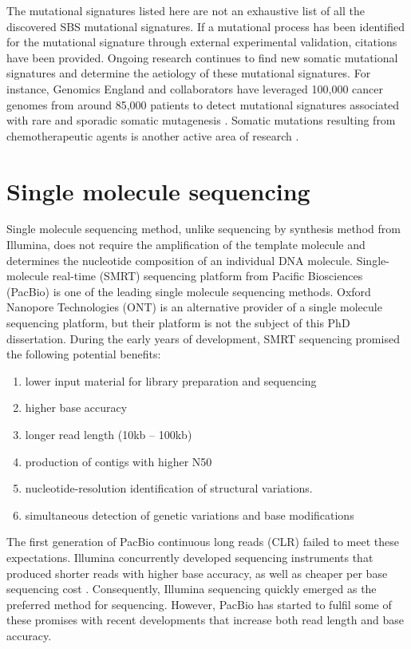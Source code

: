 \endgroup

The mutational signatures listed here are not an exhaustive list of all the discovered SBS mutational signatures. If a mutational process has been identified for the mutational signature through external experimental validation, citations have been provided. Ongoing research continues to find new somatic mutational signatures and determine the aetiology of these mutational signatures. For instance, Genomics England and collaborators have leveraged 100,000 cancer genomes from around 85,000 patients to detect mutational signatures associated with rare and sporadic somatic mutagenesis \cite{Degasperi2022-qe}. Somatic mutations resulting from chemotherapeutic agents is another active area of research \cite{Pich2019-ja, Aitken2020-sa}. 

\section{Single molecule sequencing}

Single molecule sequencing method, unlike sequencing by synthesis method from Illumina, does not require the amplification of the template molecule and determines the nucleotide composition of an individual DNA molecule. Single-molecule real-time (SMRT) sequencing platform from Pacific Biosciences (PacBio) is one of the leading single molecule sequencing methods. Oxford Nanopore Technologies (ONT) is an alternative provider of a single molecule sequencing platform, but their platform is not the subject of this PhD dissertation. During the early years of development, SMRT sequencing promised the following potential benefits:

\begin{enumerate}
\item lower input material for library preparation and sequencing
\item higher base accuracy
\item longer read length (10kb – 100kb)
\item production of contigs with higher N50
\item nucleotide-resolution identification of structural variations. 
\item simultaneous detection of genetic variations and base modifications
\end{enumerate}

The first generation of PacBio continuous long reads (CLR) failed to meet these expectations. Illumina concurrently developed sequencing instruments that produced shorter reads with higher base accuracy, as well as cheaper per base sequencing cost \cite{Bentley2008-kl}. Consequently, Illumina sequencing quickly emerged as the preferred method for sequencing. However, PacBio has started to fulfil some of these promises with recent developments that increase both read length and base accuracy. 


